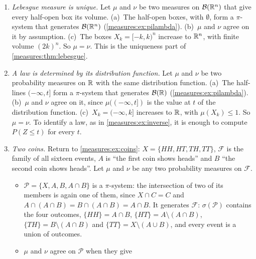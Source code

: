 \begin{notechapter}
\begin{example}
\label{measures:ex:uniqueness}
\leavevmode
\begin{enumerate}[nosep]
  \item \emph{Lebesgue measure is unique.} Let $\mu$ and $\nu$ be two
        measures on $\mathcal B(\mathbb{R}^n)$ that give every half-open box its
        volume. (a)~The half-open boxes, with $\emptyset$, form a
        $\pi$-system that generates $\mathcal B(\mathbb{R}^n)$
        (\cref{measures:ex:pilambda}). (b)~$\mu$ and $\nu$ agree on it
        by assumption. (c)~The boxes $X_k = [-k, k)^n$ increase to
        $\mathbb{R}^n$, with finite volume $(2k)^n$. So $\mu = \nu$. This is the
        uniqueness part of \cref{measures:thm:lebesgue}.
  \item \emph{A law is determined by its distribution function.} Let
        $\mu$ and $\nu$ be two probability measures on $\mathbb{R}$ with the same
        distribution function. (a)~The half-lines $(-\infty, t]$ form a
        $\pi$-system that generates $\mathcal B(\mathbb{R})$
        (\cref{measures:ex:pilambda}). (b)~$\mu$ and $\nu$ agree on it,
        since $\mu((-\infty, t])$ is the value at $t$ of the distribution
        function. (c)~$X_k = (-\infty, k]$ increases to $\mathbb{R}$, with
        $\mu(X_k)\leq1$. So $\mu = \nu$. To identify a law, as in
        \cref{measures:ex:inverse}, it is enough to compute
        $P(Z\leq t)$ for every $t$.
  \item \emph{Two coins.} Return to \cref{measures:ex:coins}:
        $X = \{HH, HT, TH, TT\}$, $\mathcal F$ is the family of all
        sixteen events, $A$ is ``the first coin shows heads'' and $B$
        ``the second coin shows heads''. Let $\mu$ and $\nu$ be any two
        probability measures on $\mathcal F$.
        \begin{itemize}[nosep]
          \item[(a)] $\mathcal P = \{X, A, B, A\cap B\}$ is a
                $\pi$-system: the intersection of two of its members is
                again one of them, since $X\cap C = C$ and
                $A\cap(A\cap B) = B\cap(A\cap B) = A\cap B$. It
                generates $\mathcal F$: $\sigma(\mathcal P)$ contains
                the four outcomes, $\{HH\} = A\cap B$,
                $\{HT\} = A\setminus(A\cap B)$,
                $\{TH\} = B\setminus(A\cap B)$ and
                $\{TT\} = X\setminus(A\cup B)$, and every event is a
                union of outcomes.
          \item[(b)] $\mu$ and $\nu$ agree on $\mathcal P$ when they give

\end{itemize}
\end{enumerate}
\end{example}
\end{notechapter}
